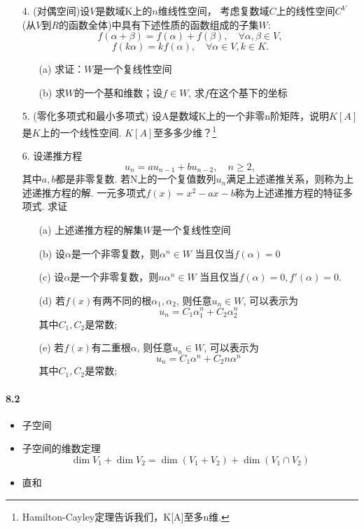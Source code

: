 \begin{itemize}
  \item[4.] (对偶空间)设$V$是数域K上的$n$维线性空间，
  考虑复数域$C$上的线性空间$C^V$(从$V$到$R$的函数全体)中具有下述性质的函数组成的子集$W$:
  $$f(\alpha+\beta)=f(\alpha) + f(\beta),\quad \forall \alpha, \beta \in V,$$
  $$f(k\alpha)=kf(\alpha),\quad \forall \alpha \in V, k \in K.$$
  \begin{itemize}
    \item [(a)] 求证：$W$是一个复线性空间
    \item [(b)] 求$W$的一个基和维数；设$f\in W$, 求$f$在这个基下的坐标
  \end{itemize}
\end{itemize}
\vspace{2cm}

\begin{itemize}
  \item[5.] (零化多项式和最小多项式)
  设A是数域K上的一个非零n阶矩阵，说明$K[A]$是$K$上的一个线性空间.
  $K[A]$至多多少维？\footnote{Hamilton-Cayley定理告诉我们，K[A]至多n维.}
\end{itemize}
\vspace{1cm}

\begin{itemize}
  \item[6.] 设递推方程
  $$u_n = au_{n-1} +bu_{n-2}, \quad n \ge 2,$$
  其中$a,b$都是非零复数. 若N上的一个复值数列$u_n$满足上述递推关系，则称为上述递推方程的解.
  一元多项式$f(x)=x^2 - ax -b$称为上述递推方程的特征多项式.
  求证
  \begin{itemize}
    \item [(a)] 上述递推方程的解集$W$是一个复线性空间
    \item [(b)] 设$\alpha$是一个非零复数，则$\alpha^n \in W$ 当且仅当$f(\alpha)=0$
    \item [(c)] 设$\alpha$是一个非零复数，则$n\alpha^n \in W$ 当且仅当$f(\alpha)=0, f'(\alpha)=0$.
    \item [(d)] 若$f(x)$有两不同的根$\alpha_1, \alpha_2$, 则任意$u_n \in W$, 可以表示为
    $$ u_n = C_1 \alpha_1^n +C_2 \alpha_2^n$$
    其中$C_1, C_2$是常数;
    \item [(e)] 若$f(x)$有二重根$\alpha$, 则任意$u_n \in W$, 可以表示为
    $$ u_n = C_1 \alpha^n +C_2 n\alpha^n$$
    其中$C_1, C_2$是常数;
  \end{itemize}
\end{itemize}
\vspace{6cm}


\paragraph{8.2}
\begin{itemize}
    \item 子空间
    \item 子空间的维数定理
    $$\dim V_1 + \dim V_2 = \dim (V_1 + V_2) + \dim (V_1 \cap V_2)$$
    \item 直和
\end{itemize}

